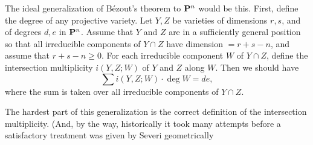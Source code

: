 {The ideal generalization of B\'ezout's theorem to $\mathbf{P}^n$ would be this. First, define the degree of any projective variety. Let $Y,Z$ be varieties of dimensions $r,s$, and of degrees $d,e$ in $\mathbf{P}^n$. Assume that $Y$ and $Z$ are in a sufficiently general position so that all irreducible components of $Y\cap Z$ have dimension $=r+s-n$, and assume that $r+s-n\geqslant0$. For each irreducible component $W$ of $Y\cap Z$, define the intersection multiplicity $i(Y,Z;W)$ of $Y$ and $Z$ along $W$. Then we should have
\[
\sum i(Y,Z;W)\cdot\deg W=de,
\]
where the sum is taken over all irreducible components of $Y\cap Z$.

The hardest part of this generalization is the correct definition of the intersection multiplicity. (And, by the way, historically it took many attempts before a satisfactory treatment was given by Severi  geometrically
}
